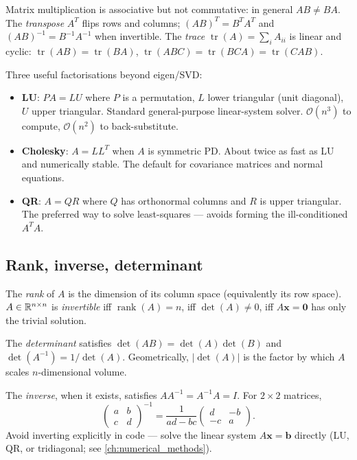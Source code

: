 Matrix multiplication is associative but not commutative: in general
$AB \ne BA$. The \emph{transpose} $A^T$ flips rows and columns;
$(AB)^T = B^T A^T$ and $(AB)^{-1} = B^{-1}A^{-1}$ when invertible.
The \emph{trace} $\operatorname{tr}(A) = \sum_i A_{ii}$ is linear and
cyclic: $\operatorname{tr}(AB) = \operatorname{tr}(BA)$,
$\operatorname{tr}(ABC) = \operatorname{tr}(BCA) = \operatorname{tr}(CAB)$.

Three useful factorisations beyond eigen/SVD:
\begin{itemize}
  \item \textbf{LU}: $PA = LU$ where $P$ is a permutation, $L$ lower
        triangular (unit diagonal), $U$ upper triangular. Standard
        general-purpose linear-system solver. $\mathcal{O}(n^3)$ to
        compute, $\mathcal{O}(n^2)$ to back-substitute.
  \item \textbf{Cholesky}: $A = LL^T$ when $A$ is symmetric PD. About
        twice as fast as LU and numerically stable. The default for
        covariance matrices and normal equations.
  \item \textbf{QR}: $A = QR$ where $Q$ has orthonormal columns and $R$
        is upper triangular. The preferred way to solve
        least-squares --- avoids forming the ill-conditioned $A^T A$.
\end{itemize}

\subsection{Rank, inverse, determinant}

The \emph{rank} of $A$ is the dimension of its column space (equivalently
its row space). $A \in \mathbb{R}^{n\times n}$ is \emph{invertible} iff
$\operatorname{rank}(A) = n$, iff $\det(A) \ne 0$, iff
$A\bm{x} = \bm{0}$ has only the trivial solution.

The \emph{determinant} satisfies $\det(AB) = \det(A)\det(B)$ and
$\det(A^{-1}) = 1/\det(A)$. Geometrically, $|\det(A)|$ is the factor by
which $A$ scales $n$-dimensional volume.

The \emph{inverse}, when it exists, satisfies $AA^{-1}=A^{-1}A = I$. For
$2\times 2$ matrices,
\[
\begin{pmatrix} a & b \\ c & d \end{pmatrix}^{-1}
= \frac{1}{ad-bc}\begin{pmatrix} d & -b \\ -c & a \end{pmatrix}.
\]
Avoid inverting explicitly in code --- solve the linear system
$A\bm{x} = \bm{b}$ directly (LU, QR, or tridiagonal; see
\cref{ch:numerical_methods}).

